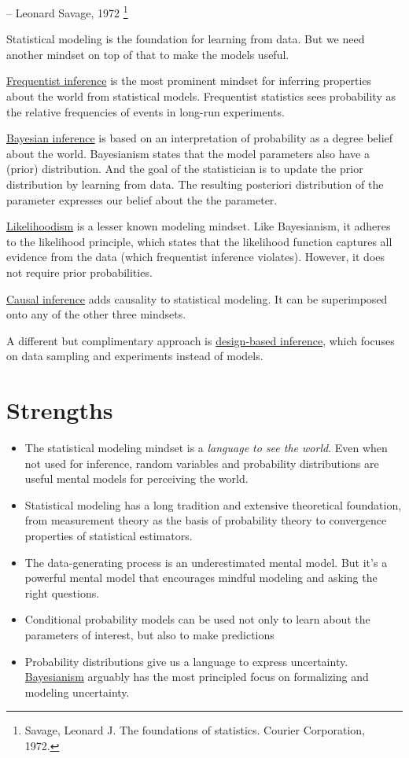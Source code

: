 \documentclass[
  10pt,
]{scrbook}
\providecommand{\tightlist}{%
  \setlength{\itemsep}{0pt}\setlength{\parskip}{0pt}}
\begin{document}
-- Leonard Savage, 1972 \footnote{Savage, Leonard J. The foundations of statistics. Courier Corporation, 1972.}

Statistical modeling is the foundation for learning from data.
But we need another mindset on top of that to make the models useful.

\protect\hyperlink{frequentism}{Frequentist inference} is the most prominent mindset for inferring properties about the world from statistical models.
Frequentist statistics sees probability as the relative frequencies of events in long-run experiments.

\protect\hyperlink{bayesian}{Bayesian inference} is based on an interpretation of probability as a degree belief about the world.
Bayesianism states that the model parameters also have a (prior) distribution.
And the goal of the statistician is to update the prior distribution by learning from data.
The resulting posteriori distribution of the parameter expresses our belief about the the parameter.

\protect\hyperlink{likelihoodism}{Likelihoodism} is a lesser known modeling mindset. Like Bayesianism, it adheres to the likelihood principle, which states that the likelihood function captures all evidence from the data (which frequentist inference violates).
However, it does not require prior probabilities.

\protect\hyperlink{causality}{Causal inference} adds causality to statistical modeling. It can be superimposed onto any of the other three mindsets.

A different but complimentary approach is \protect\hyperlink{design}{design-based inference}, which focuses on data sampling and experiments instead of models.

\hypertarget{strengths}{%
\section{Strengths}\label{strengths}}

\begin{itemize}
\tightlist
\item
  The statistical modeling mindset is a \emph{language to see the world}. Even when not used for inference, random variables and probability distributions are useful mental models for perceiving the world.
\item
  Statistical modeling has a long tradition and extensive theoretical foundation, from measurement theory as the basis of probability theory to convergence properties of statistical estimators.
\item
  The data-generating process is an underestimated mental model. But it's a powerful mental model that encourages mindful modeling and asking the right questions.
\item
  Conditional probability models can be used not only to learn about the parameters of interest, but also to make predictions
\item
  Probability distributions give us a language to express uncertainty. \protect\hyperlink{bayesianism}{Bayesianism} arguably has the most principled focus on formalizing and modeling uncertainty.
\end{itemize}
\end{document}
